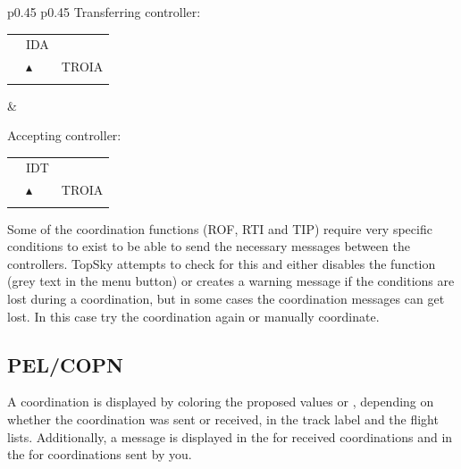 \documentclass[a4paper,oneside,11pt]{memoir}
\begin{document}
\begin{longtable}{p{} p{}}
  Transferring controller:

  \begin{tabular}{
    >{\columncolor{Flight Highlight}}l 
    >{\columncolor{Flight Highlight}}l
    >{\columncolor{Flight Highlight}}l }
    {\color{Assumed} ABC123} & {\color{Coordination} IDA}       & {\color{Assumed} }      \\
    {\color{Assumed} 100}    & {\color{Assumed} $\blacktriangle$} & {\color{Assumed} TROIA} \\
    {\color{Assumed} 180}    & {\color{Assumed} }          & {\color{Assumed} }     
  \end{tabular}
  &

  Accepting controller:

  \begin{tabular}{
    >{\columncolor{Flight Highlight}}l 
    >{\columncolor{Flight Highlight}}l
    >{\columncolor{Flight Highlight}}l }
    {\color{Coordination} ABC123} & {\color{Coordination} IDT}       & {\color{Coordination} }      \\
    {\color{Coordination} 100}    & {\color{Coordination} $\blacktriangle$} & {\color{Coordination} TROIA} \\
    {\color{Coordination} 180}    & {\color{Coordination} }          & {\color{Coordination} }     
  \end{tabular}
  \end{longtable}

\bigskip

Some of the coordination functions (ROF, RTI and TIP) require very specific conditions to exist to be able to send the necessary messages between the controllers. TopSky attempts to check for this and either disables the function (grey text in the menu button) or creates a warning message if the conditions are lost during a coordination, but in some cases the coordination messages can get lost. In this case try the coordination again or manually coordinate.

\subsection{PEL/COPN}

A coordination is displayed by coloring the proposed values  or , depending on whether the coordination was sent or received, in the track label and the flight lists. Additionally, a message is displayed in the  for received coordinations and in the  for coordinations sent by you.
\end{document}
